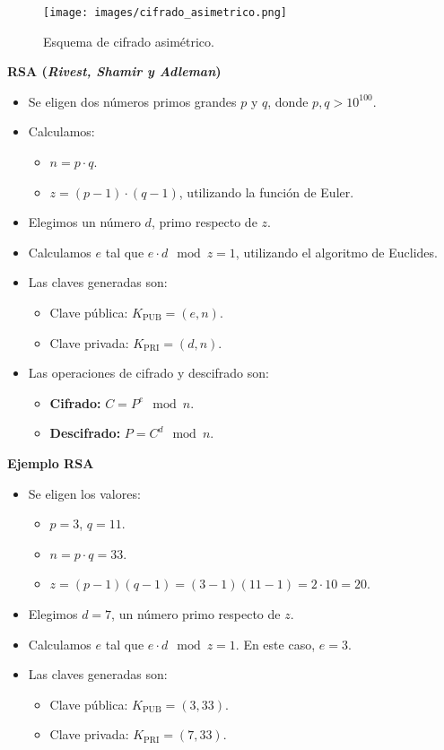 \documentclass[a4paper,12pt]{article}
\begin{document}
\begin{figure}[H]
    \centering
    \texttt{[image: images/cifrado\_asimetrico.png]}
    \caption{Esquema de cifrado asimétrico.}
\end{figure}

\textbf{RSA (\textit{Rivest, Shamir y Adleman})}

\begin{itemize}
    \item Se eligen dos números primos grandes \(p\) y \(q\), donde \(p, q > 10^{100}\).
    \item Calculamos:
    \begin{itemize}
        \item \(n = p \cdot q\).
        \item \(z = (p-1) \cdot (q-1)\), utilizando la función de Euler.
    \end{itemize}
    \item Elegimos un número \(d\), primo respecto de \(z\).
    \item Calculamos \(e\) tal que \(e \cdot d \mod z = 1\), utilizando el algoritmo de Euclides.
    \item Las claves generadas son:
    \begin{itemize}
        \item Clave pública: \(K_{\text{PUB}} = (e, n)\).
        \item Clave privada: \(K_{\text{PRI}} = (d, n)\).
    \end{itemize}
    \item Las operaciones de cifrado y descifrado son:
    \begin{itemize}
        \item \textbf{Cifrado:} \(C = P^e \mod n\).
        \item \textbf{Descifrado:} \(P = C^d \mod n\).
    \end{itemize}
\end{itemize}

\textbf{Ejemplo RSA}

\begin{itemize}
    \item Se eligen los valores:
    \begin{itemize}
        \item \(p = 3\), \(q = 11\).
        \item \(n = p \cdot q = 33\).
        \item \(z = (p-1)(q-1) = (3-1)(11-1) = 2 \cdot 10 = 20\).
    \end{itemize}
    \item Elegimos \(d = 7\), un número primo respecto de \(z\).
    \item Calculamos \(e\) tal que \(e \cdot d \mod z = 1\). En este caso, \(e = 3\).
    \item Las claves generadas son:
    \begin{itemize}
        \item Clave pública: \(K_{\text{PUB}} = (3, 33)\).
        \item Clave privada: \(K_{\text{PRI}} = (7, 33)\).
    \end{itemize}
\end{itemize}
\end{document}
